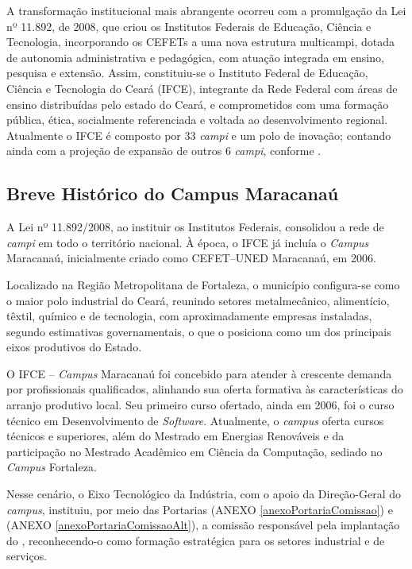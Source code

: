 A transformação institucional mais abrangente ocorreu com a promulgação da Lei nº 11.892, de 2008, que criou os Institutos Federais de Educação, Ciência e Tecnologia, incorporando os CEFETs a uma nova estrutura multicampi, dotada de autonomia administrativa e pedagógica, com atuação integrada em ensino, pesquisa e extensão. Assim, constituiu-se o Instituto Federal de Educação, Ciência e Tecnologia do Ceará (IFCE), integrante da Rede Federal com áreas de ensino distribuídas pelo estado do Ceará, e comprometidos com uma formação pública, ética, socialmente referenciada e voltada ao desenvolvimento regional. Atualmente o IFCE é composto por 33 \textit{campi} e um polo de inovação; contando ainda com a projeção de expansão de outros 6 \textit{campi}, conforme . 

\subsection{Breve Histórico do Campus Maracanaú}

A Lei nº 11.892/2008, ao instituir os Institutos Federais, consolidou a rede de \textit{campi} em todo o território nacional. À época, o IFCE já incluía o \textit{Campus} Maracanaú, inicialmente criado como CEFET–UNED Maracanaú, em 2006.

Localizado na Região Metropolitana de Fortaleza, o município configura-se como o maior polo industrial do Ceará, reunindo setores metalmecânico, alimentício, têxtil, químico e de tecnologia, com aproximadamente {} empresas instaladas, segundo estimativas governamentais, o que o posiciona como um dos principais eixos produtivos do Estado.

O IFCE – \textit{Campus} Maracanaú foi concebido para atender à crescente demanda por profissionais qualificados, alinhando sua oferta formativa às características do arranjo produtivo local. Seu primeiro curso ofertado, ainda em 2006, foi o curso técnico em Desenvolvimento de \textit{Software}. Atualmente, o \textit{campus} oferta cursos técnicos e superiores, além do Mestrado em Energias Renováveis e da participação no Mestrado Acadêmico em Ciência da Computação, sediado no \textit{Campus} Fortaleza.

Nesse cenário, o Eixo Tecnológico da Indústria, com o apoio da Direção-Geral do \textit{campus}, instituiu, por meio das Portarias \PORTARIACOMISSAO (ANEXO \ref{anexoPortariaComissao}) e \PORTARIACOMISSAOALT (ANEXO \ref{anexoPortariaComissaoAlt}), a comissão responsável pela implantação do \NOMECURSO, reconhecendo-o como formação estratégica para os setores industrial e de serviços.

